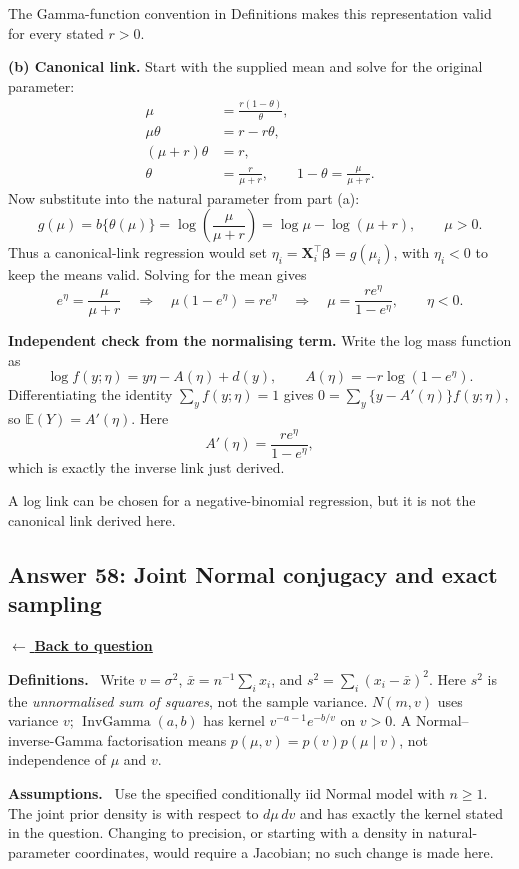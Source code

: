 \documentclass[11pt,a4paper]{article}
\newcommand{\given}{\mathrel{|}}
\DeclareMathOperator{\InvGamma}{InvGamma}
\newcommand{\E}{\mathbb{E}}
\newcommand{\answernav}[1]{%
  \label{answer:#1}%
  \noindent\hyperref[question:#1]{$\leftarrow$ \textbf{Back to question}}%
  \par\smallskip}
\newcommand{\studyheading}[1]{%
  \par\medskip\noindent\textcolor{statblue}{\textbf{#1.}}\ }
\begin{document}
The Gamma-function convention in Definitions makes this representation valid for every stated $r>0$.

\textbf{(b) Canonical link.}
Start with the supplied mean and solve for the original parameter:
\[
\begin{aligned}
\mu&=\frac{r(1-\theta)}{\theta},\\
\mu\theta&=r-r\theta,\\
(\mu+r)\theta&=r,\\
\theta&=\frac r{\mu+r},\qquad
1-\theta=\frac{\mu}{\mu+r}.
\end{aligned}
\]
Now substitute into the natural parameter from part (a):
\[
\boxed{
g(\mu)=b\{\theta(\mu)\}
=\log\left(\frac{\mu}{\mu+r}\right)
=\log\mu-\log(\mu+r),\qquad\mu>0.
}
\]
Thus a canonical-link regression would set
$\eta_i=\mathbf X_i^\top\boldsymbol\beta=g(\mu_i)$, with
$\eta_i<0$ to keep the means valid. Solving for the mean gives
\[
e^\eta=\frac{\mu}{\mu+r}
\quad\Longrightarrow\quad
\mu(1-e^\eta)=re^\eta
\quad\Longrightarrow\quad
\boxed{\mu=\frac{re^\eta}{1-e^\eta},\qquad\eta<0.}
\]

\textbf{Independent check from the normalising term.}
Write the log mass function as
\[
\log f(y;\eta)=y\eta-A(\eta)+d(y),
\qquad A(\eta)=-r\log(1-e^\eta).
\]
Differentiating the identity $\sum_y f(y;\eta)=1$ gives
$0=\sum_y\{y-A'(\eta)\}f(y;\eta)$, so $\E(Y)=A'(\eta)$.
Here
\[
A'(\eta)=\frac{re^\eta}{1-e^\eta},
\]
which is exactly the inverse link just derived.

A log link can be chosen for a negative-binomial regression, but it is not the canonical link derived here.

\clearpage

\subsection{Answer 58: Joint Normal conjugacy and exact sampling}
\answernav{58}

\studyheading{Definitions}
Write $v=\sigma^2$, $\bar x=n^{-1}\sum_i x_i$, and
$s^2=\sum_i(x_i-\bar x)^2$.
Here $s^2$ is the \emph{unnormalised sum of squares}, not the sample variance.
$N(m,v)$ uses variance $v$; $\InvGamma(a,b)$ has kernel $v^{-a-1}e^{-b/v}$ on $v>0$.
A Normal--inverse-Gamma factorisation means $p(\mu,v)=p(v)p(\mu\given v)$, not independence of $\mu$ and $v$.

\studyheading{Assumptions}
Use the specified conditionally iid Normal model with $n\ge1$.
The joint prior density is with respect to $d\mu\,dv$ and has exactly the kernel stated in the question.
Changing to precision, or starting with a density in natural-parameter coordinates, would require a Jacobian; no such change is made here.
\end{document}
